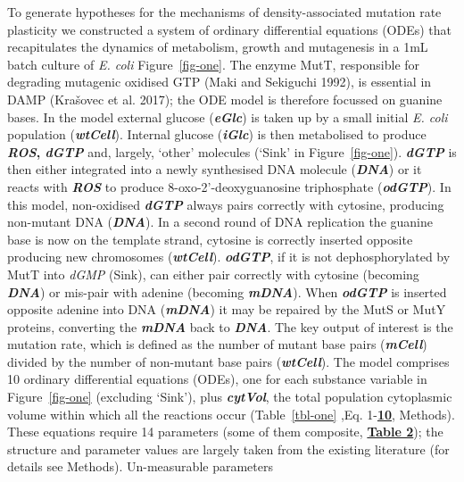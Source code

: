 \documentclass[
  12pt,
  letterpaper,
  DIV=11,
  numbers=noendperiod]{scrreprt}
\begin{document}
To generate hypotheses for the mechanisms of density-associated mutation
rate plasticity we constructed a system of ordinary differential
equations (ODEs) that recapitulates the dynamics of metabolism, growth
and mutagenesis in a 1mL batch culture of \emph{E. coli}
Figure~\ref{fig-one}. The enzyme MutT, responsible for degrading
mutagenic oxidised GTP (Maki and Sekiguchi 1992), is essential in DAMP
(Krašovec et al. 2017); the ODE model is therefore focussed on guanine
bases. In the model external glucose (\textbf{\emph{eGlc}}) is taken up
by a small initial \emph{E. coli} population (\textbf{\emph{wtCell}}).
Internal glucose (\textbf{\emph{iGlc}}) is then metabolised to produce
\textbf{\emph{ROS}, \emph{dGTP}} and, largely, `other' molecules (`Sink'
in Figure~\ref{fig-one}). \textbf{\emph{dGTP}} is then either integrated
into a newly synthesised DNA molecule (\textbf{\emph{DNA}}) or it reacts
with \textbf{\emph{ROS}} to produce 8-oxo-2'-deoxyguanosine triphosphate
(\textbf{\emph{odGTP}}). In this model, non-oxidised
\textbf{\emph{dGTP}} always pairs correctly with cytosine, producing
non-mutant DNA (\textbf{\emph{DNA}}). In a second round of DNA
replication the guanine base is now on the template strand, cytosine is
correctly inserted opposite producing new chromosomes
(\textbf{\emph{wtCell}}). \textbf{\emph{odGTP}}, if it is not
dephosphorylated by MutT into \emph{dGMP} (Sink), can either pair
correctly with cytosine (becoming \textbf{\emph{DNA}}) or mis-pair with
adenine (becoming \textbf{\emph{mDNA}}). When \textbf{\emph{odGTP}} is
inserted opposite adenine into DNA (\textbf{\emph{mDNA}}) it may be
repaired by the MutS or MutY proteins, converting the
\textbf{\emph{mDNA}} back to \textbf{\emph{DNA}}. The key output of
interest is the mutation rate, which is defined as the number of mutant
base pairs (\textbf{\emph{mCell}}) divided by the number of non-mutant
base pairs (\textbf{\emph{wtCell}}). The model comprises 10 ordinary
differential equations (ODEs), one for each substance variable in
Figure~\ref{fig-one} (excluding `Sink'), plus \textbf{\emph{cytVol}},
the total population cytoplasmic volume within which all the reactions
occur (Table~\ref{tbl-one} ,Eq.
1-\href{https://www.biorxiv.org/content/10.1101/2023.09.27.557722v1.full\#disp-formula-10}{\textbf{10}},
Methods). These equations require 14 parameters (some of them composite,
\href{https://www.biorxiv.org/content/10.1101/2023.09.27.557722v1.full\#T2}{\textbf{Table
2}}); the structure and parameter values are largely taken from the
existing literature (for details see Methods). Un-measurable parameters
\end{document}
